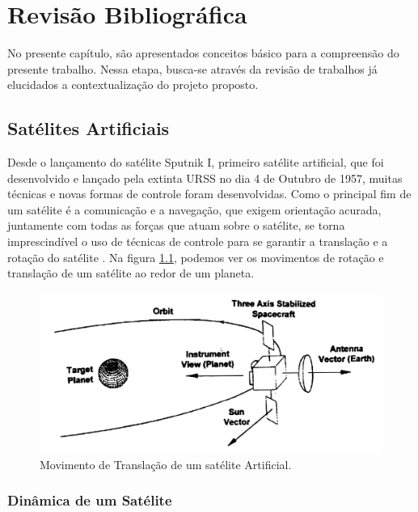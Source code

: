 \chapter{Revisão Bibliográfica}

No presente capítulo, são apresentados conceitos básico para a compreensão do presente trabalho. Nessa etapa, busca-se através da revisão de trabalhos já elucidados a contextualização do projeto proposto.

\section{Satélites Artificiais} %

Desde o lançamento do satélite Sputnik I, primeiro satélite artificial, que foi desenvolvido e lançado pela extinta URSS no dia 4 de Outubro de 1957, muitas técnicas e novas formas de controle foram desenvolvidas. Como o principal fim de um satélite é a comunicação e a navegação, que exigem orientação acurada, juntamente com todas as forças que atuam sobre o satélite, se torna imprescindível o uso de técnicas de controle para se garantir a translação e a rotação do satélite \cite{Brown2002}. Na figura \ref{fig:rotational_brown_p256}, podemos ver os movimentos de rotação e translação de um satélite ao redor de um planeta.

\begin{figure}[!ht]
  \caption{Movimento de Translação de um satélite Artificial.}
  \begin{center}
      \includegraphics[scale=0.5]{img/rotational_brown_p256}
  \end{center}
  \label{fig:rotational_brown_p256}
\end{figure}

\subsection{Dinâmica de um Satélite}

